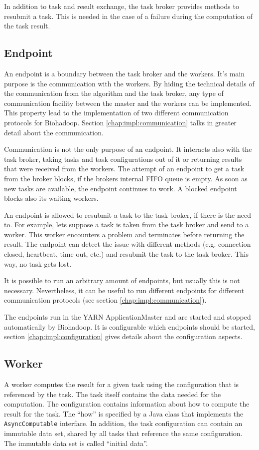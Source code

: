 In addition to task and result exchange, the task broker provides methods to resubmit a task. This is needed in the case of a failure during the computation of the task result.

\subsection{Endpoint}
\label{chap:impl:endpoint}
An endpoint is a boundary between the task broker and the workers. It's main purpose is the communication with the workers. By hiding the technical details of the communication from the algorithm and the task broker, any type of communication facility between the master and the workers can be implemented. This property lead to the implementation of two different communication protocols for Biohadoop. Section \ref{chap:impl:communication} talks in greater detail about the communication.

Communication is not the only purpose of an endpoint. It interacts also with the task broker, taking tasks and task configurations out of it or returning results that were received from the workers. The attempt of an endpoint to get a task from the broker blocks, if the brokers internal FIFO queue is empty. As soon as new tasks are available, the endpoint continues to work. A blocked endpoint blocks also its waiting workers.

An endpoint is allowed to resubmit a task to the task broker, if there is the need to. For example, lets suppose a task is taken from the task broker and send to a worker. This worker encounters a problem and terminates before returning the result. The endpoint can detect the issue with different methods (e.g. connection closed, heartbeat, time out, etc.) and resubmit the task to the task broker. This way, no task gets lost.

It is possible to run an arbitrary amount of endpoints, but usually this is not necessary. Nevertheless, it can be useful to run different endpoints for different communication protocols (see section \ref{chap:impl:communication}).

The endpoints run in the YARN ApplicationMaster and are started and stopped automatically by Biohadoop. It is configurable which endpoints should be started, section \ref{chap:impl:configuration} gives details about the configuration aspects.

\subsection{Worker}
\label{chap:impl:worker}
A worker computes the result for a given task using the configuration that is referenced by the task. The task itself contains the data needed for the computation. The configuration contains information about how to compute the result for the task. The ``how'' is specified by a Java class that implements the \texttt{AsyncComputable} interface. In addition, the task configuration can contain an immutable data set, shared by all tasks that reference the same configuration. The immutable data set is called  ``initial data''.

